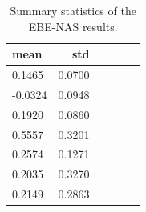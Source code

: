 \begin{table}
\caption{Summary statistics of the EBE-NAS results.}
\label{tab:ebe_summary}
\begin{tabular}{lrrrrr}
\toprule
mean & std \\
\midrule
0.1465 & 0.0700 \\
-0.0324 & 0.0948 \\
0.1920 & 0.0860 \\
0.5557 & 0.3201 \\
0.2574 & 0.1271 \\
0.2035 & 0.3270 \\
0.2149 & 0.2863 \\
\bottomrule
\end{tabular}
\end{table}
